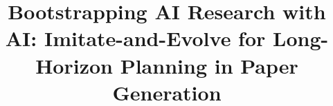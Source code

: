 \documentclass[manuscript,review,anonymous]{acmart}
\begin{document}
\title{Bootstrapping AI Research with AI: Imitate-and-Evolve for Long-Horizon Planning in Paper Generation}









\end{document}
